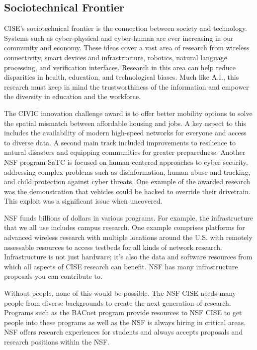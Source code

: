 \documentclass[journal,onecolumn]{IEEEtran}
\begin{document}
\subsection{Sociotechnical Frontier}

CISE's sociotechnical frontier is the connection between society and technology. Systems such as cyber-physical and cyber-human are ever increasing in our community and economy. These ideas cover a vast area of research from wireless connectivity, smart devices and infrastructure, robotics, natural language processing, and verification interfaces. Research in this area can help reduce disparities in health, education, and technological biases. Much like A.I., this research must keep in mind the trustworthiness of the information and empower the diversity in education and the workforce. 

The CIVIC innovation challenge award is to offer better mobility options to solve the spatial mismatch between affordable housing and jobs. A key aspect to this includes the availability of modern high-speed networks for everyone and access to diverse data. A second main track included improvements to resilience to natural disasters and equipping communities for greater preparedness. Another NSF program SaTC is focused on human-centered approaches to cyber security, addressing complex problems such as disinformation, human abuse and tracking, and child protection against cyber threats. One example of the awarded research was the demonstration that vehicles could be hacked to override their drivetrain. This exploit was a significant issue when uncovered. 

NSF funds billions of dollars in various programs. For example, the infrastructure that we all use includes campus research. One example comprises platforms for advanced wireless research with multiple locations around the U.S. with remotely assessable resources to access testbeds for all kinds of network research. Infrastructure is not just hardware; it's also the data and software resources from which all aspects of CISE research can benefit. NSF has many infrastructure proposals you can contribute to. 

Without people, none of this would be possible. The NSF CISE needs many people from diverse backgrounds to create the next generation of research. Programs such as the BACnet program provide resources to NSF CISE to get people into these programs as well as the NSF is always hiring in critical areas. NSF offers research experiences for students and always accepts proposals and research positions within the NSF.
\end{document}
